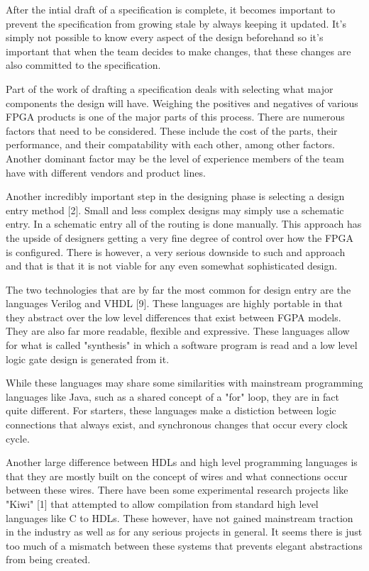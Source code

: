 \documentclass{article}
\begin{document}
    After the intial draft of a specification is complete, it becomes important
    to prevent the specification from growing stale by always keeping it updated.
    It's simply not possible to know every aspect of the design beforehand so
    it's important that when the team decides to make changes, that these changes
    are also committed to the specification.

    Part of the work of drafting a specification deals with selecting what major components
    the design will have. Weighing the positives and negatives of various FPGA products
    is one of the major parts of this process. There are numerous factors that need to be
    considered. These include the cost of the parts, their performance, and their compatability
    with each other, among other factors. Another dominant factor may be
    the level of experience members of the team have with different vendors and product lines.

    Another incredibly important step in the designing phase is selecting a design
    entry method [2]. Small and less complex designs may simply use a schematic entry.
    In a schematic entry all of the routing is done manually.
    This approach has the upside of designers getting a very fine degree of control over
    how the FPGA is configured.
    There is however, a very serious downside to such and approach and that is that it
    is not viable for any even somewhat sophisticated design.

    The two technologies that are by far the most common for design entry are the languages
    Verilog and VHDL [9]. These languages are highly portable in that they abstract
    over the low level differences that exist between FGPA models.
    They are also far more readable, flexible and expressive. These languages
    allow for what is called "synthesis" in which a software program is read
    and a low level logic gate design is generated from it.

    While these languages may share some similarities with mainstream programming languages
    like Java, such as a shared concept of a "for" loop, they are in fact quite different.
    For starters, these languages make a distiction between logic connections that
    always exist, and synchronous changes that occur every clock cycle.

    Another large difference between HDLs and high level programming languages is that
    they are mostly built on the concept of wires and what connections occur between these
    wires. There have been some experimental research projects like "Kiwi" [1] that
    attempted to allow compilation from standard high level languages like C to HDLs.
    These however, have not gained mainstream traction in the industry as well as for any serious
    projects in general. It seems there is just too much of a mismatch between
    these systems that prevents elegant abstractions from being created.
\end{document}
